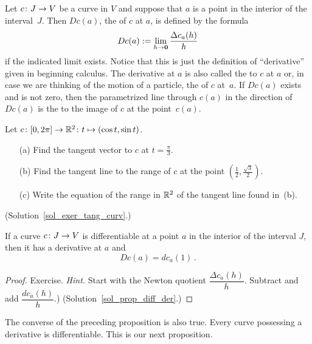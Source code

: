 \begin{defn} Let $c\colon J \rightarrow V$ be a curve in $V$ and suppose that $a$ is a point in the
interior of the interval~$J$.  Then
$Dc(a)$, the
 of $c$ at $a$, is defined by the formula
  \[ Dc(a) := \lim_{h \rightarrow \mathbf{0}}\frac{\Delta c_a(h)}h \]
if the indicated limit exists.  Notice that this is just the definition of ``derivative''
given in beginning calculus.  The derivative at $a$ is also called the
 to $c$ at $a$ or, in case we are thinking of the motion of a particle, the
 of $c$ at~$a$.  If $Dc(a)$ exists and is not zero, then the parametrized line
through $c(a)$ in the direction of $Dc(a)$ is the
 to the image of $c$ at the point~$c(a)$.
\end{defn}

\begin{exer}\label{exer_tang_curv}  Let $c\colon [0,2\pi] \rightarrow \mathbb{R}^2\colon  t \mapsto (\cos t,\sin t)$.
 \begin{enumerate}
  \item[(a)] Find the tangent vector to $c$ at $t=\frac{\pi}3$.
  \item[(b)] Find the tangent line to the range of $c$ at the point $(\frac12,\frac{\sqrt 3}2)$.
  \item[(c)] Write the equation of the range in $\mathbb{R}^2$ of the tangent line found in~(b).
 \end{enumerate}
(Solution~\ref{sol_exer_tang_curv}.)
\end{exer}

\begin{prop} \label{prop_diff_der} If a curve $c\colon J \rightarrow V$ is differentiable at a point $a$
in the interior of the interval $J$, then it has a derivative at $a$ and
  \[ Dc(a) = dc_a(1)\,. \]
\end{prop}

\begin{proof} Exercise.  \emph{Hint.}  Start with the Newton quotient $\dfrac{\Delta c_a(h)}h$.
Subtract and add $\dfrac{dc_a(h)}h$.)  (Solution~\ref{sol_prop_diff_der}.)    \ns
\end{proof}


The converse of the preceding proposition is also true. Every curve possessing a derivative is
differentiable. This is our next proposition.

